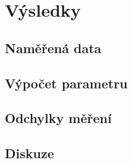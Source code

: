 \section{Výsledky}


\subsection{Naměřená data}

\subsection{Výpočet parametru}

\subsection{Odchylky měření}

\subsection{Diskuze}
